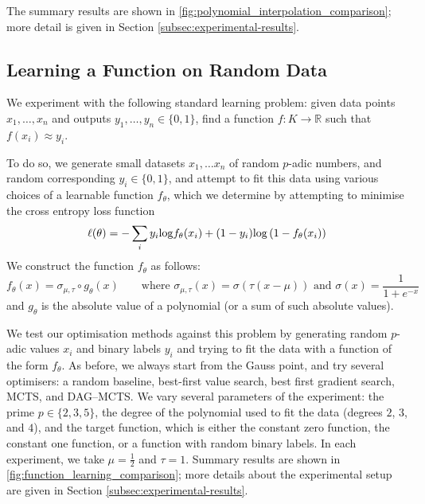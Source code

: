 \documentclass[10pt]{article}
\theoremstyle{definition}
\def\log{{\rm log}}
\newcommand{\RR}{\mathbb{R}}
\begin{document}
The summary results are shown in \cref{fig:polynomial_interpolation_comparison}; more detail is given in Section \ref{subsec:experimental-results}.

\subsection{Learning a Function on Random Data}

We experiment with the following standard learning problem: given data points $x_1, \dotsc, x_n$ and outputs $y_1, \dotsc, y_n \in \{0, 1\}$, find a function $f : K \to \RR$ such that $f(x_i) \approx y_i$. 

To do so, we generate small datasets $x_1, \dotsc x_n$ of random $p$-adic numbers, and random corresponding $y_i \in \{0, 1\}$, and attempt to fit this data using various choices of a learnable function $f_\theta$, which we determine by attempting to minimise the cross entropy loss function
$$
  \ell(\theta) = - \sum_i y_i \log f_\theta(x_i) + (1-y_i) \log \left(1 - f_\theta(x_i) \right) 
$$
We construct the function $f_\theta$ as follows:
$$
f_\theta(x) = \sigma_{\mu, \tau} \circ g_\theta(x)\qquad\text{where }
\sigma_{\mu, \tau}(x) = \sigma(\tau (x - \mu)) \text{ and }
\sigma(x) = \frac{1}{1 + e ^ {-x}}
$$
and $g_\theta$ is the absolute value of a polynomial (or a sum of such absolute values). 

We test our optimisation methods against this problem by generating random $p$-adic values $x_i$ and binary labels $y_i$ and trying to fit the data with a function of the form $f_\theta$.
As before, we always start from the Gauss point, and try several optimisers: a random baseline, best-first value search, best first gradient search, MCTS, and DAG--MCTS. We vary several parameters of the experiment:
the prime $p \in \{2, 3, 5\}$, the degree of the polynomial used to fit the data (degrees $2$, $3$, and $4$), and the target function, which is either the constant zero function, the constant one function, or a function with random binary labels. In each experiment, we take $\mu = \frac 1 2$ and $\tau = 1$. Summary results are shown in \cref{fig:function_learning_comparison}; more details about the experimental setup are given in Section \ref{subsec:experimental-results}.
\end{document}
